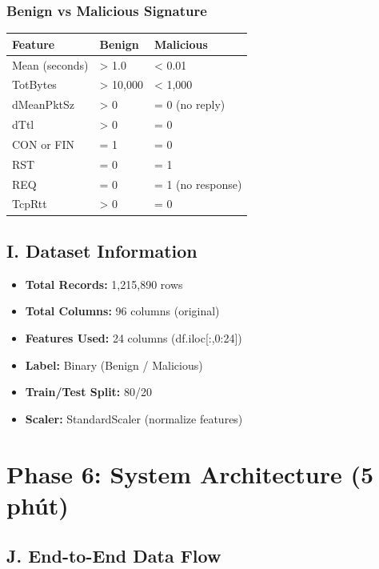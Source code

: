 \documentclass[12pt,a4paper]{article}
\begin{document}
\subsubsection{Benign vs Malicious Signature}

\begin{table}[h]
\centering
\begin{tabularx}{\textwidth}{|l|l|l|}
\hline
\textbf{Feature} & \textbf{Benign} & \textbf{Malicious} \\
\hline
Mean (seconds) & > 1.0 & < 0.01 \\
\hline
TotBytes & > 10,000 & < 1,000 \\
\hline
dMeanPktSz & > 0 & = 0 (no reply) \\
\hline
dTtl & > 0 & = 0 \\
\hline
CON or FIN & = 1 & = 0 \\
\hline
RST & = 0 & = 1 \\
\hline
REQ & = 0 & = 1 (no response) \\
\hline
TcpRtt & > 0 & = 0 \\
\hline
\end{tabularx}
\end{table}

\subsection{I. Dataset Information}

\begin{itemize}
    \item \textbf{Total Records:} 1,215,890 rows
    \item \textbf{Total Columns:} 96 columns (original)
    \item \textbf{Features Used:} 24 columns (df.iloc[:,0:24])
    \item \textbf{Label:} Binary (Benign / Malicious)
    \item \textbf{Train/Test Split:} 80/20
    \item \textbf{Scaler:} StandardScaler (normalize features)
\end{itemize}

\section{Phase 6: System Architecture (5 phút)}

\subsection{J. End-to-End Data Flow}
\end{document}
